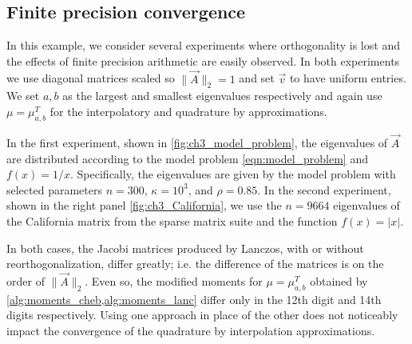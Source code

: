 \subsection{Finite precision convergence}

In this example, we consider several experiments where orthogonality is lost and the effects of finite precision arithmetic are easily observed.
In both experiments we use diagonal matrices scaled so \( \| \vec{A} \|_2 = 1 \) and set \( \vec{v} \) to have uniform entries.
We set \( a,b \) as the largest and smallest eigenvalues respectively and again use \( \mu = \mu_{a,b}^T \) for the interpolatory and quadrature by approximations.


In the first experiment, shown in \cref{fig:ch3_model_problem}, the eigenvalues of \( \vec{A} \) are distributed according to the model problem \cref{eqn:model_problem} and \( f(x) = 1/x \).
Specifically, the eigenvalues are given by the model problem with selected parameters \( n = 300 \), \( \kappa = 10^3 \), and \( \rho = 0.85 \).
In the second experiment, shown in the right panel \cref{fig:ch3_California}, we use the \( n=9664 \) eigenvalues of the California matrix from the sparse matrix suite \cite{davis_hu_11} and the function \( f(x) = |x| \).


In both cases, the Jacobi matrices produced by Lanczos, with or without reorthogonalization, differ greatly; i.e. the difference of the matrices is on the order of \( \| \vec{A} \|_2 \). 
Even so, the modified moments for \( \mu = \mu_{a,b}^T \) obtained by \cref{alg:moments_cheb,alg:moments_lanc} differ only in the 12th digit and 14th digits respectively.
Using one approach in place of the other does not noticeably impact the convergence of the quadrature by interpolation approximations.





